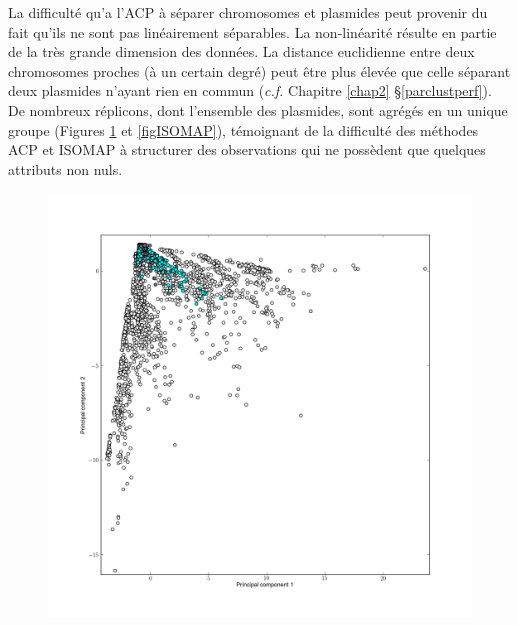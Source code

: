  
La difficulté qu'a l'ACP à séparer chromosomes et plasmides peut provenir du fait qu’ils ne sont pas linéairement séparables. La non-linéarité résulte en partie de la très grande dimension des données. La distance euclidienne entre deux chromosomes proches (à un certain degré) peut être plus élevée que celle séparant deux plasmides n'ayant rien en commun (\textit{c.f.} Chapitre \ref{chap2} \S \ref{parclustperf}). De nombreux réplicons, dont l'ensemble des plasmides, sont agrégés en un unique groupe (Figures \ref{figPCA} et \ref{figISOMAP}), témoignant de la difficulté des méthodes ACP et ISOMAP à structurer des observations qui ne possèdent que quelques attributs non nuls.
	  
\begin{figure}[H]
	\begin{minipage}{0.50\textwidth}
	\includegraphics[trim=3cm 3cm 2cm 2cm,clip, width=\textwidth]{./img/pca_visu.png}
	\label{figPCA}
	\end{minipage}
	\begin{minipage}{0.50\textwidth}

\end{minipage}
\end{figure}
